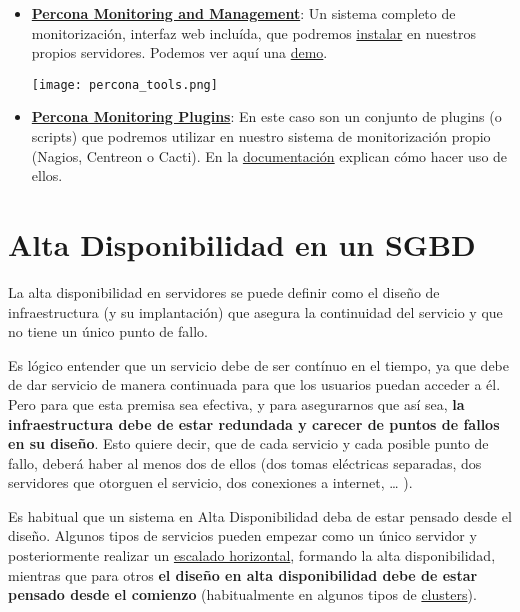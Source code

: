 \begin{itemize}
    \item \href{https://www.percona.com/software/database-tools/percona-monitoring-and-management}{\textbf{Percona Monitoring and Management}}: Un sistema completo de monitorización, interfaz web incluída, que podremos \href{https://www.percona.com/software/pmm/quickstart}{instalar} en nuestros propios servidores. Podemos ver aquí una \href{https://pmmdemo.percona.com/graph/}{demo}.

    \texttt{[image: percona\_tools.png]}

    \item \href{https://www.percona.com/software/database-tools/percona-monitoring-plugins}{\textbf{Percona Monitoring Plugins}}: En este caso son un conjunto de plugins (o scripts) que podremos utilizar en nuestro sistema de monitorización propio (Nagios, Centreon o Cacti). En la \href{https://www.percona.com/doc/percona-monitoring-plugins/LATEST/index.html}{documentación} explican cómo hacer uso de ellos.
\end{itemize}



\chapter{Alta Disponibilidad en un SGBD}

La alta disponibilidad en servidores se puede definir como el diseño de infraestructura (y su implantación) que asegura la continuidad del servicio y que no tiene un único punto de fallo.

Es lógico entender que un servicio debe de ser contínuo en el tiempo, ya que debe de dar servicio de manera continuada para que los usuarios puedan acceder a él. Pero para que esta premisa sea efectiva, y para asegurarnos que así sea, \textbf{la infraestructura debe de estar redundada y carecer de puntos de fallos en su diseño}.  Esto quiere decir, que de cada servicio y cada posible punto de fallo, deberá haber al menos dos de ellos (dos tomas eléctricas separadas, dos servidores que otorguen el servicio, dos conexiones a internet, … ).

Es habitual que un sistema en Alta Disponibilidad deba de estar pensado desde el diseño. Algunos tipos  de servicios pueden empezar como un único servidor y posteriormente realizar un \hyperlink{escalado_horizontal}{escalado horizontal}, formando la alta disponibilidad, mientras que para otros \textbf{el diseño en alta disponibilidad debe de estar pensado desde el comienzo} (habitualmente en algunos tipos de \hyperlink{cluster}{clusters}).


